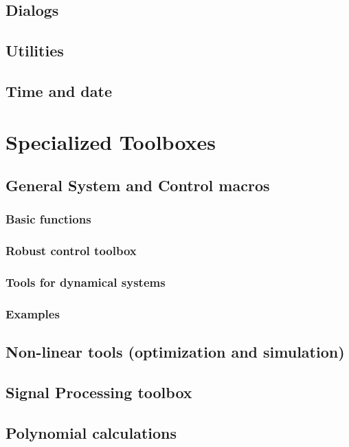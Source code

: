 \chapter{Dialogs}
\setcounter{section}{1}\setcounter{subsection}{0}
        
\chapter{Utilities}
\setcounter{section}{1}\setcounter{subsection}{0}
        
\chapter{Time and date}
\setcounter{section}{1}\setcounter{subsection}{0}
        
\part{Specialized Toolboxes}
\chapter{General System and Control macros}
\section{Basic functions}
         
\section{Robust control toolbox}
         
\section{Tools for dynamical systems}
        
\section{Examples}
        
\chapter{Non-linear tools (optimization and simulation) }
\setcounter{section}{1}\setcounter{subsection}{0}
        
\chapter{Signal Processing toolbox}
\setcounter{section}{1}\setcounter{subsection}{0}
        
\chapter{Polynomial calculations}
\setcounter{section}{1}\setcounter{subsection}{0}
        
